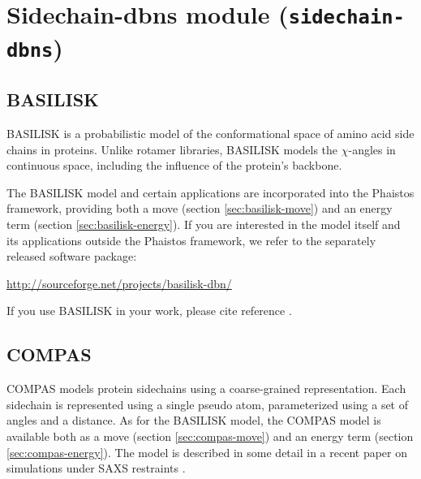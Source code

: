 
\chapter{Sidechain-dbns module (\texttt{sidechain-dbns})}
\label{cha:sidechain-dbns-module}

\section{BASILISK}
\label{sec:basilisk}

BASILISK is a probabilistic model of the conformational space of 
amino acid side chains in proteins. Unlike rotamer libraries, 
BASILISK models the $\chi$-angles in continuous space, including 
the influence of the protein's backbone.

The BASILISK model and certain applications are incorporated into the
Phaistos framework, providing both a move (section
\ref{sec:basilisk-move}) and an energy term (section
\ref{sec:basilisk-energy}). If you are interested in the model itself
and its applications outside the Phaistos framework, we refer to the
separately released software package:

\begin{center}
\url{http://sourceforge.net/projects/basilisk-dbn/}
\end{center}

\noindent If you use BASILISK in your work, please cite
reference \cite{harder2010beyond}.


\section{COMPAS}
\label{sec:compas}

COMPAS models protein sidechains using a coarse-grained
representation. Each sidechain is represented using a single pseudo
atom, parameterized using a set of angles and a distance.  As for the
BASILISK model, the COMPAS model is available both as a move (section
\ref{sec:compas-move}) and an energy term (section
\ref{sec:compas-energy}). The model is described in some detail in a
recent paper on simulations under SAXS restraints
\cite{stovgaard2011}.

